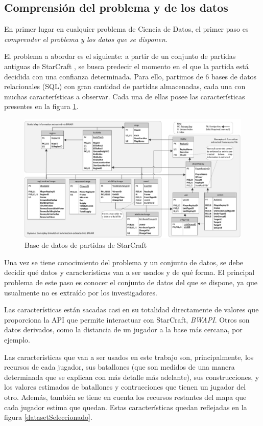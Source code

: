 \documentclass[a4paper,11pt]{book}\usepackage[]{graphicx}\usepackage[]{color}
\makeatletter
\def\maxwidth{ %
  \ifdim\Gin@nat@width>\linewidth
    \linewidth
  \else
    \Gin@nat@width
  \fi
}
\makeatother
\begin{document}
\subsection{Comprensión del problema y de los datos}

En primer lugar en cualquier problema de Ciencia de Datos, el primer
paso es \emph{comprender el problema y los datos que se disponen}.

El problema a abordar es el siguiente: a partir de un conjunto de
partidas antiguas de StarCraft \cite{dataset2014}, se busca predecir
el momento en el que la partida está decidida con una confianza
determinada. Para ello, partimos de 6 bases de datos relacionales
(SQL) con gran cantidad de partidas almacenadas, cada una con muchas
características a observar. Cada una de ellas posee las
características presentes en la figura \ref{dataset}.


\begin{figure}
    \centering
    \includegraphics[width=\maxwidth]{figure/Robertson14DatabaseDiagram}
    \caption{Base de datos de partidas de StarCraft}
    \label{dataset}
\end{figure}



Una vez se tiene conocimiento del problema y un conjunto de datos, se
debe decidir qué datos y características van a ser usados y de qué
forma. El principal problema de este paso es conocer el conjunto de
datos del que se dispone, ya que usualmente no es extraído por los
investigadores.

Las características están sacadas casi en su totalidad directamente de
valores que proporciona la API que permite interactuar con StarCraft,
\emph{BWAPI}. Otros son datos derivados, como la distancia de un
jugador a la base más cercana, por ejemplo.

Las características que van a ser usados en este trabajo son,
principalmente, los recursos de cada jugador, sus batallones (que son
medidos de una manera determinada que se explican con más detalle más
adelante), sus construcciones, y los valores estimados de batallones y
contrucciones que tienen un jugador del otro. Además, también se tiene
en cuenta los recursos restantes del mapa que cada jugador estima que
quedan. Estas características quedan reflejadas en la figura
\ref{datasetSeleccionado}.
\end{document}
